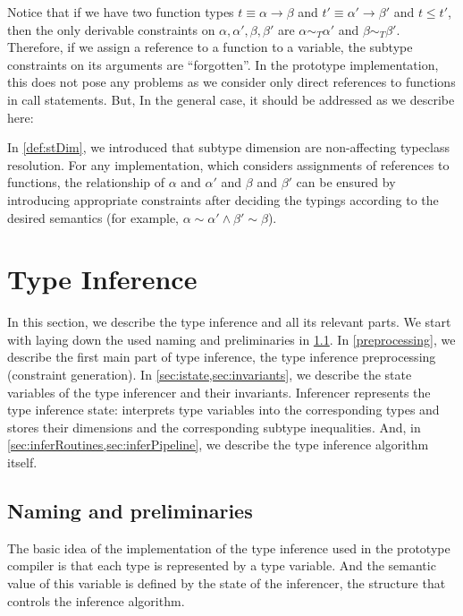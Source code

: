 Notice that if we have two function types $t \equiv \alpha \to \beta$ and $t' \equiv \alpha' \to \beta'$ and $t \leq t'$, then the only derivable constraints on $\alpha, \alpha', \beta, \beta'$ are $\alpha \sim_T \alpha'$ and $\beta \sim_T \beta'$. Therefore, if we assign a reference to a function to a variable, the subtype constraints on its arguments are ``forgotten''. In the prototype implementation, this does not pose any problems as we consider only direct references to functions in call statements. But, In the general case, it should be addressed as we describe here:

In \cref{def:stDim}, we introduced that subtype dimension are non-affecting typeclass resolution. For any implementation, which considers assignments of references to functions, the relationship of $\alpha$ and $\alpha'$ and $\beta$ and $\beta'$ can be ensured by introducing appropriate constraints after deciding the typings according to the desired semantics (for example, $\alpha \sim \alpha' \land \beta' \sim \beta$).

\section{Type Inference}
\label{sec:typeInf}

In this section, we describe the type inference and all its relevant parts. We start with laying down the used naming and preliminaries in \cref{sec:namingPrel}. In \cref{preprocessing}, we describe the first main part of type inference, the type inference preprocessing (constraint generation). In \cref{sec:istate,sec:invariants}, we describe the state variables of the type inferencer and their invariants. Inferencer represents the type inference state: interprets type variables into the corresponding types and stores their dimensions and the corresponding subtype inequalities. And, in \cref{sec:inferRoutines,sec:inferPipeline}, we describe the type inference algorithm itself.

\subsection{Naming and preliminaries}
\label{sec:namingPrel}

The basic idea of the implementation of the type inference used in the prototype compiler is that each type is represented by a type variable. And the semantic value of this variable is defined by the state of the inferencer, the structure that controls the inference algorithm.

